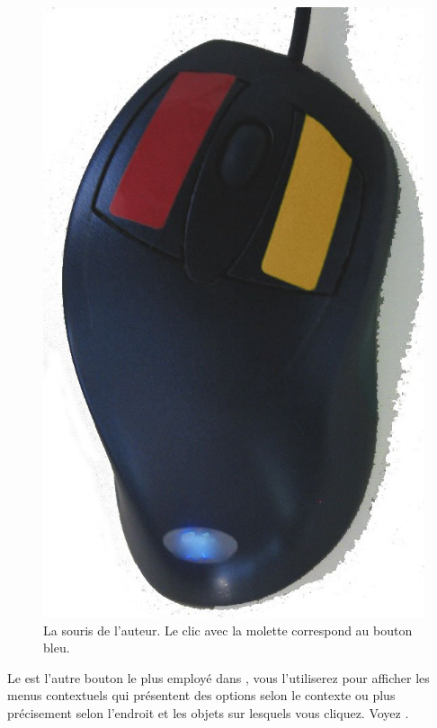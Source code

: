 \documentclass[a4paper,10pt,twoside]{book}
\begin{document}
\begin{figure}
\includegraphics[width=0.95\linewidth]{colouredMouse}
\caption{La souris de l'auteur. Le clic avec la molette correspond au bouton bleu.\label{fig:colouredMouse}}
\end{figure}


Le  est l'autre bouton le plus employé dans \sq, vous l'utiliserez pour afficher les menus contextuels qui présentent des options selon le contexte ou plus précisement selon l'endroit et les objets sur lesquels vous cliquez. Voyez .
\end{document}
